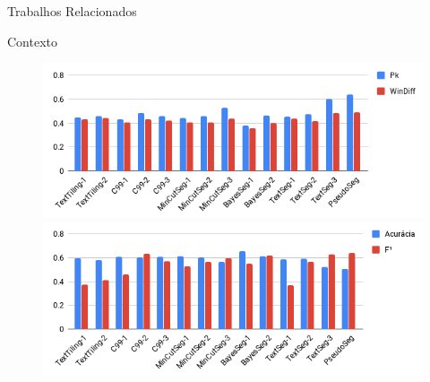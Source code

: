 \begin{frame}{Trabalhos Relacionados}
\begin{frame}{Contexto}
\end{frame}











































\begin{figure}[!ht] \centering     %

		\includegraphics[width=.82\textwidth]{images/graficos/resumo-wd-pk.png}	
		\label{fig:resumo-wd-pka}
		\includegraphics[width=.82\textwidth]{images/graficos/resumo-tradicionais.png}	
		\label{fig:resumo-tradicionaisa}
\end{figure}






\end{frame}
